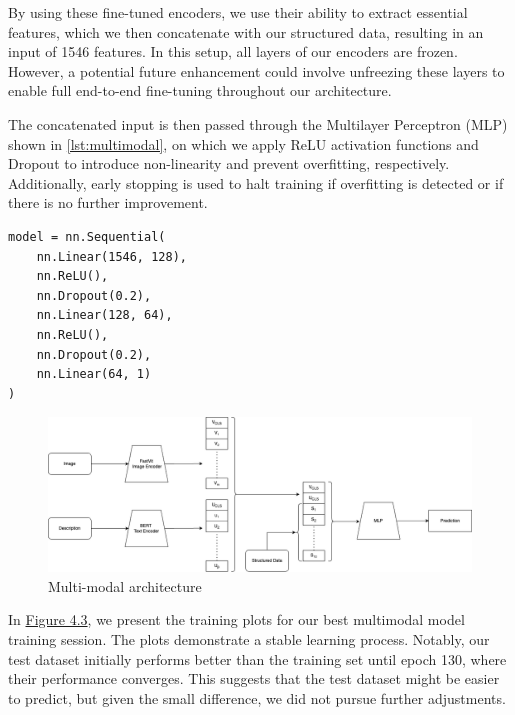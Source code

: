 By using these fine-tuned encoders, we use their ability to extract essential features, which we then concatenate with our structured data, resulting in an input of 1546 features. In this setup, all layers of our encoders are frozen. However, a potential future enhancement could involve unfreezing these layers to enable full end-to-end fine-tuning throughout our architecture.

The concatenated input is then passed through the Multilayer Perceptron (MLP) shown in \autoref{lst:multimodal}, on which we apply ReLU activation functions and Dropout to introduce non-linearity and prevent overfitting, respectively. Additionally, early stopping is used to halt training if overfitting is detected or if there is no further improvement.

\begin{lstlisting}[label={lst:multimodal}]
model = nn.Sequential(
    nn.Linear(1546, 128),
    nn.ReLU(),
    nn.Dropout(0.2),
    nn.Linear(128, 64),
    nn.ReLU(),
    nn.Dropout(0.2),
    nn.Linear(64, 1)
)
\end{lstlisting}


\begin{figure}[ht]
    \centering
    \includegraphics[width=\linewidth]{images/priceprediction/model/arch.png}
    \caption{Multi-modal architecture}
    \label{fig:model-architecture}
\end{figure}

In \hyperref[fig:multimodal-results]{Figure 4.3}, we present the training plots for our best multimodal model training session. The plots demonstrate a stable learning process. Notably, our test dataset initially performs better than the training set until epoch 130, where their performance converges. This suggests that the test dataset might be easier to predict, but given the small difference, we did not pursue further adjustments.


